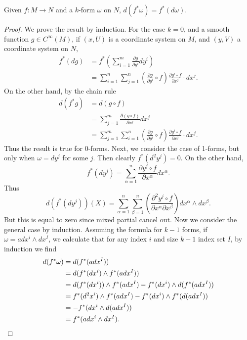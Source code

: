\begin{theorem}
    Given $f: M \to N$ and a $k$-form $\omega$ on $N$, $d(f^*\omega) = f^*(d\omega)$.
\end{theorem}
\begin{proof}
    We prove the result by induction. For the case $k = 0$, and a smooth function $g \in C^\infty(M)$, if $(x,U)$ is a coordinate system on $M$, and $(y,V)$ a coordinate system on $N$,
    \begin{align*}
        f^*(dg) &= f^* \left( \sum_{i = 1}^m \frac{\partial g}{\partial y^i} dy^i \right)\\
        &= \sum_{i = 1}^n \sum_{j = 1}^n \left( \frac{\partial g}{\partial y^i} \circ f \right) \frac{\partial y^i \circ f}{\partial x^j} \cdot dx^j.
    \end{align*}
    On the other hand, by the chain rule
    \begin{align*}
        d(f^* g) &= d(g \circ f)\\
        &= \sum_{j = 1}^m \frac{\partial (g \circ f)}{\partial x^j} dx^j\\
        &= \sum_{j = 1}^m \sum_{i = 1}^n \left( \frac{\partial g}{\partial y^i} \circ f \right) \frac{\partial y^i \circ f}{\partial x^j} \cdot dx^j.
    \end{align*}
    Thus the result is true for $0$-forms. Next, we consider the case of 1-forms, but only when $\omega = dy^j$ for some $j$. Then clearly $f^*(d^2y^j) = 0$. On the other hand,
    \[ f^*(dy^j) = \sum_{\alpha = 1}^n \frac{\partial y^j \circ f}{\partial x^\alpha} dx^\alpha. \]
    Thus
    \[ d(f^*(dy^j))(X) = \sum_{\alpha = 1}^n \sum_{\beta = 1}^n \left( \frac{\partial^2 y^j \circ f}{\partial x^\alpha \partial x^\beta} \right) dx^\alpha \wedge dx^\beta. \]
    But this is equal to zero since mixed partial cancel out. Now we consider the general case by induction. Assuming the formula for $k-1$ forms, if $\omega = a dx^i \wedge dx^I$, we calculate that for any index $i$ and size $k-1$ index set $I$, by induction we find
    \begin{align*}
        d(f^* \omega) &= d(f^*(a dx^I))\\
        &= d(f^*(dx^i) \wedge f^*(a dx^I))\\
        &= d(f^*(dx^i)) \wedge f^*(a dx^I) - f^*(dx^i) \wedge d(f^*(a dx^I))\\
        &= f^*(d^2 x^i) \wedge f^*(a dx^I) - f^*(dx^i) \wedge f^*(d(a dx^I))\\
        &= - f^*(dx^i \wedge d(a dx^I))\\
        &= f^*(a dx^i \wedge dx^I). \qedhere
    \end{align*}
\end{proof}

